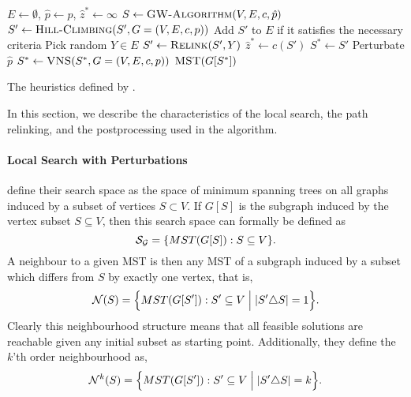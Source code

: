  \begin{algorithm}[h!]
   \begin{algorithmic}[1]
     \State $E \gets \emptyset$, $\hat{p} \gets p$, $\hat{z}^* \gets \infty$
     \State $S \gets \Call{GW-Algorithm}{V,E, c, \hat{p}}$ \label{alg:canuto:line:gw}
     \State $S' \gets \Call{Hill-Climbing}{S', G = (V, E, c, p)}$ \label{alg:canuto:line:hc}
     \State Add $S'$ to $E$ if it satisfies the necessary criteria \label{alg:canuto:line:elite}
     \State Pick random $Y \in E$
     \State $S' \gets \Call{Relink}{S', Y}$ \label{alg:canuto:line:relink}
     \State $\hat{z}^* \gets c(S')$
     \State $S^* \gets S'$
     \EndIf
     \EndIf
     \State Perturbate $\hat{p}$
     \EndFor
     \State $S^* \gets \Call{VNS}{S^*, G = (V, E, c, p)}$\label{alg:canuto:line:vns}
     \State \Return $\Call{MST}{G[S^*]}$
     \EndProcedure
 \end{algorithmic}
 \caption{The heuristics defined by \citet{canuto2001local}.}\label{alg:heuristics:canuto}
 \end{algorithm}

 In this section, we
 describe the characteristics of the local search, the
 path relinking, and the postprocessing used in the algorithm.
\paragraph{Local Search with Perturbations}
\citet{canuto2001local} define their search space as the space of minimum spanning
trees on all graphs induced by a subset of vertices
 $S \subset V$. If $G[S]$ is the subgraph induced by the vertex subset $S \subseteq V$, then
 this search space can formally be defined as
\[\mathcal{S_G} = \{MST(G[S]) : S \subseteq V \}\mathnormal{.}\]
A neighbour to a given MST is then any MST of a subgraph induced by a subset which differs from $S$
 by exactly one vertex, that is,
\[\mathcal{N}(S) = \Big\{MST(G[S']) : S' \subseteq V \Bigm| |S' \triangle S| = 1 \Big\}\mathnormal{.}\] 
Clearly this neighbourhood structure means that all feasible solutions are reachable
given any initial subset as starting point. Additionally, they define the
$k$'th order neighbourhood as,
\[\mathcal{N}^k(S) = \Big\{MST(G[S']) : S' \subseteq V \Bigm| |S' \triangle S| = k \Big\}\mathnormal{.}\] 

